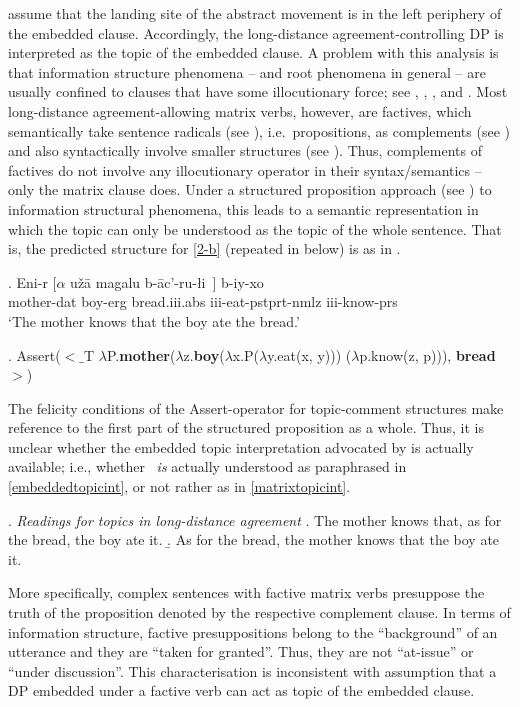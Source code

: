 \documentclass[output=paper
,modfonts
,nonflat]{langsci/langscibook}
\begin{document}
\cite{Polinsky&Potsdam:01} assume that the landing site of the
abstract movement is in the left periphery of the embedded
clause. Accordingly, the long-distance agreement-controlling DP is
interpreted as the topic of the embedded clause. A problem with this
analysis is that information structure phenomena -- and root phenomena
in general -- are usually confined to clauses that have some
illocutionary force; see \cite{Hooper&Thompson:73},
    \cite{Ebertetal08}, \cite{Krifkainprep}, and \cite{Maticetal14}. Most long-distance agreement-allowing
matrix verbs, however, are factives, which semantically take sentence
radicals (see \cite{Stenius67}), i.e.~propositions, as complements (see \cite{Krifka04})
 and also syntactically involve smaller
structures (see \cite{deCubaUrogdi10}). Thus, complements of
factives do not involve any illocutionary operator in their
syntax/semantics -- only the matrix clause does. Under a structured
proposition approach  (see \cite{Krifka92}) to information structural
phenomena, this leads to a semantic representation in which the topic
can only be understood as the topic of the whole sentence. That is,
the predicted structure for \ref{2-b}  (repeated in
\Next below) is as in \NNext.

\exig.  Eni-r [$\alpha$ u\v{z}\={a} \label{2d-b}magalu b-\={a}c'-ru-\l i~] b-iy-xo \\
     mother-{\sc dat} {} boy-{\sc erg} bread.{\sc iii.abs} {\sc iii}-eat-{\sc pstprt-nmlz} {\sc iii}-know-{\sc prs} \\
      `The mother knows that the boy ate the bread.'

\Lsciex. {\sc Assert}($<$$\_$T $\lambda$P.{\bf mother}($\lambda$z.{\bf boy}($\lambda$x.P($\lambda$y.eat(x, y))) ($\lambda$p.know(z, p))), {\bf bread}$>$)

The felicity conditions of the {\sc Assert}-operator for topic-comment
structures make reference to the first part of the structured
proposition as a whole. Thus, it is unclear whether the embedded topic interpretation
   advocated by \cite{Polinsky&Potsdam:01}  is actually available;
   i.e.,  whether \LLast\ {\it is} actually understood as paraphrased in \ref{embeddedtopicint}, or not rather as in \ref{matrixtopicint}.
   
\Lsciex. {\it Readings for topics in long-distance agreement}
    \a. \label{embeddedtopicint}{The mother knows that, as for the bread, the boy ate it.}
    \b. \label{matrixtopicint}{As for the bread, the mother knows that the boy ate it.}

More specifically, complex sentences with factive matrix verbs
presuppose the truth of the proposition denoted by the respective
complement clause. In terms of information structure, factive
presuppositions belong to the ``background'' of an utterance and they
are ``taken for granted''. Thus, they are not ``at-issue'' or ``under
discussion''. This characterisation is inconsistent with
 assumption that a DP embedded under a factive verb
can act as topic of the embedded clause.
\end{document}
